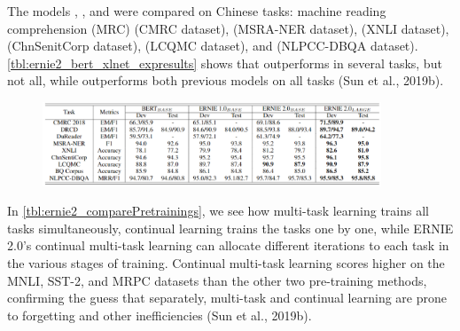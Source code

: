 The models , , and  were compared on Chinese tasks: machine reading comprehension (MRC) (CMRC dataset),  (MSRA-NER dataset),  (XNLI dataset),  (ChnSenitCorp dataset),  (LCQMC dataset), and  (NLPCC-DBQA dataset). \cref{tbl:ernie2_bert_xlnet_expresults} shows that  outperforms  in several tasks, but not all, while  outperforms both previous models on all tasks (Sun et al., 2019b). 


\begin{figure}[h]
\vspace{-5pt}
\centering
\includegraphics[width=0.9\textwidth]{imgs/ernie2_tableBERTvs_e2_e1.png}
\vspace{-5pt}
\vspace{-5pt}
\label{tbl:ernie2_ernie1_bert_expresults}
\end{figure}

In \cref{tbl:ernie2_comparePretrainings}, we see how multi-task learning trains all tasks simultaneously, continual learning trains the tasks one by one, while ERNIE 2.0's continual multi-task learning can allocate different iterations to each task in the various stages of training. Continual multi-task learning scores higher on the MNLI, SST-2, and MRPC datasets than the other two pre-training methods, confirming the guess that separately, multi-task and continual learning are prone to forgetting and other inefficiencies (Sun et al., 2019b). 

